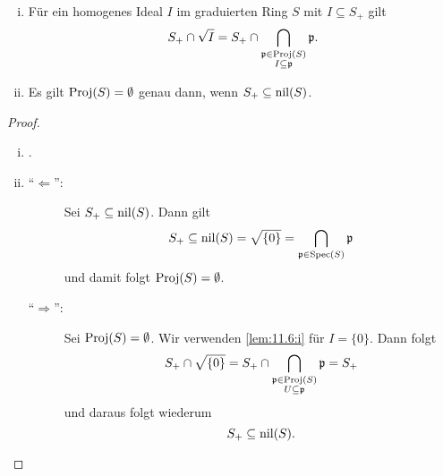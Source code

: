 \begin{lem}
\label{lem:11.6}
	\begin{enumerate}[i)]
		\item\label{lem:11.6:i} Für ein homogenes Ideal $I$ im graduierten Ring $S$ mit $I \subseteq S_+$ gilt
		\[
			S_+ \cap \sqrt{I} = S_+ \cap \bigcap_{\substack{\mathfrak{p} \in \operatorname{Proj}(S)\\I\subseteq\mathfrak{p}}}\mathfrak{p}.
		\]
		\item\label{lem:11.6:ii} Es gilt $\operatorname{Proj}(S) = \emptyset$ genau dann, wenn $S_+\subseteq \operatorname{nil}(S)$.
	\end{enumerate}
	\begin{proof}
		\begin{enumerate}[i)]
			\item \cite[Proposition~13.2~(3)]{goertz2010algebraic}.
			\item \begin{description}
				\item[\enquote{$\Leftarrow$}:] Sei $S_+\subseteq \operatorname{nil}(S)$. Dann gilt
				\[
					S_+ \subseteq \operatorname{nil}(S) = \sqrt{\{0\}} = \bigcap_{\mathfrak{p}\in \operatorname{Spec}(S)}\mathfrak{p}
				\]
				und damit folgt $\operatorname{Proj}(S) = \emptyset$.
				\item[\enquote{$\Rightarrow$}:] Sei $\operatorname{Proj}(S) = \emptyset$. Wir verwenden \ref{lem:11.6:i} für $I=\{0\}$. Dann folgt
				\[
					S_+\cap \sqrt{\{0\}} = S_+ \cap \bigcap_{\substack{\mathfrak{p} \in \operatorname{Proj}(S)\\U\subseteq\mathfrak{p}}}\mathfrak{p} = S_+
				\]
				und daraus folgt wiederum
				\[
					S_+ \subseteq \operatorname{nil}(S).
				\]
			\end{description}
		\end{enumerate}
	\end{proof}
\end{lem}

